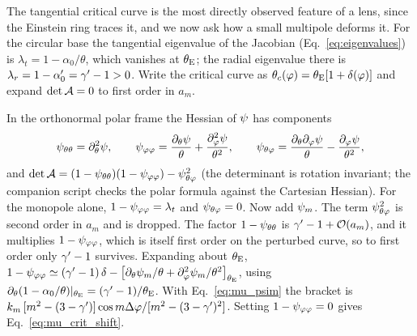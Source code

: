 The tangential critical curve is the most directly observed feature of
a lens, since the Einstein ring traces it, and we now ask how a small
multipole deforms it.  For the circular base the tangential eigenvalue of the Jacobian
(Eq.~\eqref{eq:eigenvalues}) is $\lambda_t = 1-\alpha_0/\theta$, which
vanishes at $\theta_{\mathrm{E}}$; the radial eigenvalue there is
$\lambda_r = 1-\alpha_0' = \gamma'-1 > 0$.  Write the critical curve as
$\theta_c(\varphi) = \theta_{\mathrm{E}}[1+\delta(\varphi)]$ and expand
$\det\mathcal{A}=0$ to first order in $a_m$.

\begin{derivation}
In the orthonormal polar frame the Hessian of $\psi$ has components
\[
    \psi_{\theta\theta} = \partial_\theta^2\psi,\qquad
    \psi_{\varphi\varphi} = \frac{\partial_\theta\psi}{\theta}
                          + \frac{\partial_\varphi^2\psi}{\theta^2},\qquad
    \psi_{\theta\varphi} = \frac{\partial_\theta\partial_\varphi\psi}{\theta}
                          - \frac{\partial_\varphi\psi}{\theta^2},
\]
and $\det\mathcal{A} = (1-\psi_{\theta\theta})(1-\psi_{\varphi\varphi})
- \psi_{\theta\varphi}^2$ (the determinant is rotation invariant; the
companion script checks the polar formula against the Cartesian
Hessian).  For the monopole alone, $1-\psi_{\varphi\varphi} =
\lambda_t$ and $\psi_{\theta\varphi}=0$.  Now add $\psi_m$.  The term
$\psi_{\theta\varphi}^2$ is second order in $a_m$ and is dropped.  The
factor $1-\psi_{\theta\theta}$ is $\gamma'-1+\mathcal{O}\!\left(a_m\right)$, and it
multiplies $1-\psi_{\varphi\varphi}$, which is itself first order on
the perturbed curve, so to first order only $\gamma'-1$ survives.
Expanding about $\theta_{\mathrm{E}}$,
$1-\psi_{\varphi\varphi} \simeq (\gamma'-1)\,\delta
- \big[\partial_\theta\psi_m/\theta + \partial_\varphi^2\psi_m/\theta^2\big]_{\theta_{\mathrm{E}}}$,
using $\partial_\theta(1-\alpha_0/\theta)|_{\theta_{\mathrm{E}}} = (\gamma'-1)/\theta_{\mathrm{E}}$.
With Eq.~\eqref{eq:mu_psim} the bracket is
$k_m\,[m^2-(3-\gamma')]\cos m\Delta\varphi/[m^2-(3-\gamma')^2]$.
Setting $1-\psi_{\varphi\varphi}=0$ gives Eq.~\eqref{eq:mu_crit_shift}.
\end{derivation}

